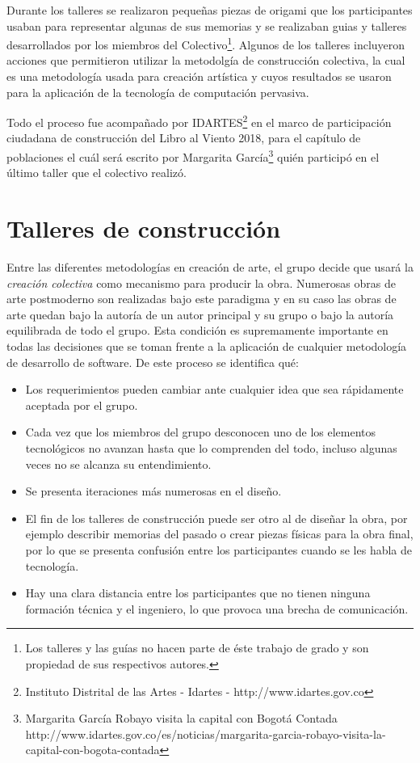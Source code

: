 Durante los talleres se realizaron pequeñas piezas de origami que los participantes usaban para representar algunas de sus memorias y se realizaban guias y talleres desarrollados por los miembros del Colectivo\footnote{Los talleres y las guías no hacen parte de éste trabajo de grado y son propiedad de sus respectivos autores.}. Algunos de los talleres incluyeron acciones que permitieron utilizar la metodolgía de construcción colectiva, la cual es una metodología usada para creación artística y cuyos resultados se usaron para la aplicación de la tecnología de computación pervasiva.

Todo el proceso fue acompañado por IDARTES\footnote{Instituto Distrital de las Artes - Idartes - http://www.idartes.gov.co} en el marco de participación ciudadana de construcción del Libro al Viento 2018, para el capítulo de poblaciones el cuál será escrito por Margarita García\cite{idartesmargarita}\footnote{Margarita García Robayo visita la capital con Bogotá Contada http://www.idartes.gov.co/es/noticias/margarita-garcia-robayo-visita-la-capital-con-bogota-contada} quién participó en el último taller que el colectivo realizó.

\section{Talleres de construcción}

Entre las diferentes metodologías en creación de arte, el grupo decide que usará la \textit{creación colectiva}\cite{casacuberta2003creacion} como mecanismo para producir la obra. Numerosas obras de arte postmoderno son realizadas bajo este paradigma y en su caso las obras de arte quedan bajo la autoría de un autor principal y su grupo o bajo la autoría equilibrada de todo el grupo. Esta condición es supremamente importante en todas las decisiones que se toman frente a la aplicación de cualquier metodología de desarrollo de software. De este proceso se identifica qué: 

\begin{itemize}
    \item Los requerimientos pueden cambiar ante cualquier idea que sea rápidamente aceptada por el grupo.
    \item Cada vez que los miembros del grupo desconocen uno de los elementos tecnológicos no avanzan hasta que lo comprenden del todo, incluso algunas veces no se alcanza su entendimiento.
    \item Se presenta iteraciones más numerosas en el diseño.
    \item El fin de los talleres de construcción puede ser otro al de diseñar la obra, por ejemplo describir memorias del pasado o crear piezas físicas para la obra final, por lo que se presenta confusión entre los participantes cuando se les habla de tecnología.
    \item Hay una clara distancia entre los participantes que no tienen ninguna formación técnica y el ingeniero, lo que provoca una brecha de comunicación.
\end{itemize}

